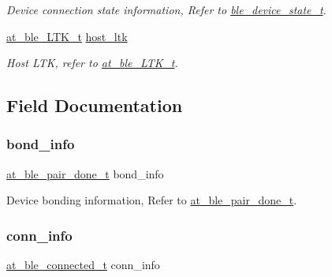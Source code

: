 \begin{DoxyCompactItemize}
\begin{DoxyCompactList}\small\item\em Device connection state information, Refer to \mbox{\hyperlink{ble__manager_8h_abcdab7066ca2dc0d328ed5e555cdcf7c}{ble\+\_\+device\+\_\+state\+\_\+t}}. \end{DoxyCompactList}\item 
\mbox{\hyperlink{structat__ble___l_t_k__t}{at\+\_\+ble\+\_\+\+L\+T\+K\+\_\+t}} \mbox{\hyperlink{structble__connected__dev__info_ae4b4bc5db220b6da7c3757edf423186e}{host\+\_\+ltk}}
\begin{DoxyCompactList}\small\item\em Host L\+TK, refer to \mbox{\hyperlink{structat__ble___l_t_k__t}{at\+\_\+ble\+\_\+\+L\+T\+K\+\_\+t}}. \end{DoxyCompactList}\end{DoxyCompactItemize}


\subsection{Field Documentation}
\mbox{\label{structble__connected__dev__info_a57618d0b6b8d51f05746d330848ad96a}} 
\subsubsection{\texorpdfstring{bond\_info}{bond\_info}}
{\footnotesize\ttfamily \mbox{\hyperlink{structat__ble__pair__done__t}{at\+\_\+ble\+\_\+pair\+\_\+done\+\_\+t}} bond\+\_\+info}



Device bonding information, Refer to \mbox{\hyperlink{structat__ble__pair__done__t}{at\+\_\+ble\+\_\+pair\+\_\+done\+\_\+t}}. 

\mbox{\label{structble__connected__dev__info_af980db94ada9d4ffb126d2ed39ece59f}} 
\subsubsection{\texorpdfstring{conn\_info}{conn\_info}}
{\footnotesize\ttfamily \mbox{\hyperlink{structat__ble__connected__t}{at\+\_\+ble\+\_\+connected\+\_\+t}} conn\+\_\+info}



